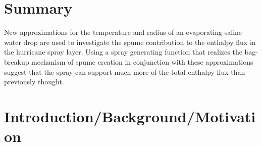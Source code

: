 \documentclass[10pt,a4paper]{article}
\begin{document}
 \renewcommand{\theenumi}{\Roman{enumi}}
 \renewcommand{\theenumii}{\arabic{enumii}}
 \renewcommand{\theenumiii}{\alpha{enumiii}}
 
\section{Summary}

\large

New approximations for the temperature and radius of an evaporating saline water drop are used to investigate the spume contribution to the enthalpy flux in the hurricane spray layer. Using a spray generating function that realizes the bag-breakup mechanism of spume creation in conjunction with these approximations suggest that the spray can support much more of the total enthalpy flux than previously thought.

 \section{Introduction/Background/Motivation}
 
\end{document}
